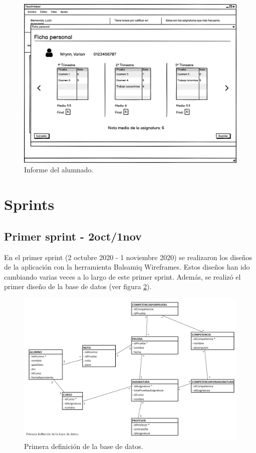 \begin{figure}[h]
\centering\includegraphics[width=1\linewidth]{figs/mockup_informealumno.png}
\caption{Informe del alumnado.}
\label{Fig:mockup_informealumno}
\end{figure}




\section{Sprints}


\subsection{Primer sprint - 2oct/1nov}

En el primer sprint (2 octubre 2020 - 1 noviembre 2020) se realizaron los diseños de la aplicación con la herramienta Balsamiq Wireframes. Estos diseños han ido cambiando varias veces a lo largo de este primer sprint. Además, se realizó el primer diseño de la base de datos (ver figura \ref{Fig:db_definition1}).

\begin{figure}[h]
\centering\includegraphics[width=1\linewidth]{figs/DB_Definition_1.png}
\caption{Primera definición de la base de datos.}
\label{Fig:db_definition1}
\end{figure}

